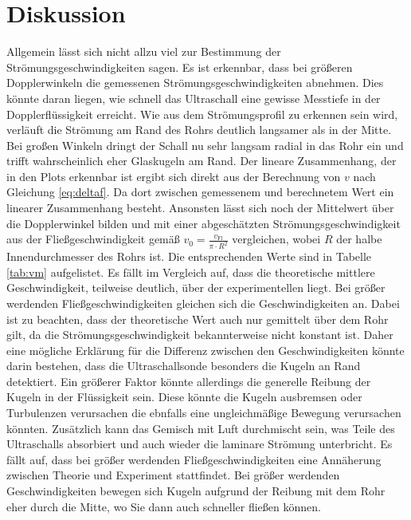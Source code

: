 \section{Diskussion}
Allgemein lässt sich nicht allzu viel zur Bestimmung der Strömungsgeschwindigkeiten sagen.
Es ist erkennbar, dass bei größeren Dopplerwinkeln die gemessenen Strömungsgeschwindigkeiten abnehmen. Dies könnte daran liegen, wie schnell das Ultraschall 
eine gewisse Messtiefe in der Dopplerflüssigkeit erreicht. Wie aus dem Strömungsprofil zu erkennen sein wird, verläuft die Strömung am Rand des Rohrs deutlich langsamer als in der Mitte.
Bei großen Winkeln dringt der Schall nu sehr langsam radial in das Rohr ein und trifft wahrscheinlich eher Glaskugeln am Rand.
Der lineare Zusammenhang, der in den Plots erkennbar ist ergibt sich direkt aus der Berechnung von $v$ nach Gleichung \eqref{eq:deltaf}. Da dort zwischen gemessenem und
berechnetem Wert ein linearer Zusammenhang besteht.
Ansonsten lässt sich noch der Mittelwert über die Dopplerwinkel bilden und mit einer abgeschätzten Strömungsgeschwindigkeit aus 
der Fließgeschwindigkeit gemäß $v_0=\frac{v_{\text{Fl}}}{\pi \cdot R^2}$ vergleichen, wobei $R$ der halbe Innendurchmesser des Rohrs ist.
Die entsprechenden Werte sind in Tabelle \ref{tab:vm} aufgelistet. Es fällt im Vergleich auf, dass die theoretische mittlere Geschwindigkeit, teilweise deutlich, über der experimentellen liegt.
Bei größer werdenden Fließgeschwindigkeiten gleichen sich die Geschwindigkeiten an. Dabei ist zu beachten, dass der theoretische Wert auch nur gemittelt über dem Rohr gilt, da die Strömungsgeschwindigkeit bekannterweise
nicht konstant ist. Daher eine mögliche Erklärung für die Differenz zwischen den Geschwindigkeiten könnte darin bestehen, dass die Ultraschallsonde besonders die Kugeln an Rand detektiert. Ein größerer Faktor könnte allerdings die
generelle Reibung der Kugeln in der Flüssigkeit sein. Diese könnte die Kugeln ausbremsen oder Turbulenzen verursachen die ebnfalls eine ungleichmäßige Bewegung verursachen könnten.
Zusätzlich kann das Gemisch mit Luft durchmischt sein, was Teile des Ultraschalls absorbiert und auch wieder die laminare Strömung unterbricht.
Es fällt auf, dass bei größer werdenden Fließgeschwindigkeiten eine Annäherung zwischen Theorie und Experiment stattfindet. Bei größer werdenden
Geschwindigkeiten bewegen sich Kugeln aufgrund der Reibung mit dem Rohr eher durch die Mitte, wo Sie dann auch schneller fließen können.
